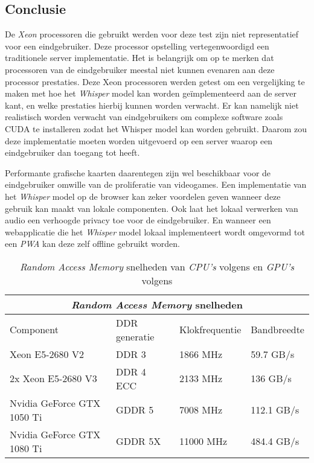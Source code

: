 \subsection{Conclusie}

De \textit{Xeon} processoren die gebruikt werden voor deze test zijn niet representatief voor een eindgebruiker. Deze processor opstelling vertegenwoordigd een traditionele server implementatie. Het is belangrijk om op te merken dat processoren van de eindgebruiker meestal niet kunnen evenaren aan deze processor prestaties. Deze Xeon processoren werden getest om een vergelijking te maken met hoe het \textit{Whisper} model kan worden geïmplementeerd aan de server kant, en welke prestaties hierbij kunnen worden verwacht. Er kan namelijk niet realistisch worden verwacht van eindgebruikers om complexe software zoals CUDA te installeren zodat het Whisper model kan worden gebruikt. Daarom zou deze implementatie moeten worden uitgevoerd op een server waarop een eindgebruiker dan toegang tot heeft.

\bigbreak{}

Performante grafische kaarten daarentegen zijn wel beschikbaar voor de eindgebruiker omwille van de proliferatie van videogames. Een implementatie van het \textit{Whisper} model op de browser kan zeker voordelen geven wanneer deze gebruik kan maakt van lokale componenten. Ook laat het lokaal verwerken van audio een verhoogde privacy toe voor de eindgebruiker. En wanneer een webapplicatie die het \textit{Whisper} model lokaal implementeert wordt omgevormd tot een \textit{PWA} kan deze zelf offline gebruikt worden.

\begin{table}[b]
    \begin{tabular}{ |p{5.3cm}|p{2.9cm}|p{3.0cm}|p{2.7cm}|  }
        \hline
        \multicolumn{4}{|c|}{\textit{Random Access Memory} snelheden} \\
        \hline
        Component& DDR generatie & Klokfrequentie & Bandbreedte \\
        \hline
            Xeon E5-2680 V2             & DDR 3     & 1866 MHz  & 59.7 GB/s \\
            2x Xeon E5-2680 V3          & DDR 4 ECC & 2133 MHz  & 136 GB/s  \\
            Nvidia GeForce GTX 1050 Ti  & GDDR 5    & 7008 MHz  & 112.1 GB/s\\
            Nvidia GeForce GTX 1080 Ti  & GDDR 5X   & 11000 MHz & 484.4 GB/s\\
        \hline
    \end{tabular}
    \caption[Verschillen in RAM snelheden voor \textit{CPU's} en \textit{GPU's}~\autocite{Intel2013,Intel2014,TechPowerUp2016, TechPowerUp2017}]{\textit{Random Access Memory} snelheden van \textit{CPU's} volgens \textcite{Intel2013,Intel2014} en \textit{GPU's} volgens \textcite{TechPowerUp2016, TechPowerUp2017}}
    \label{tab:RAMSpeeds}
\end{table}
